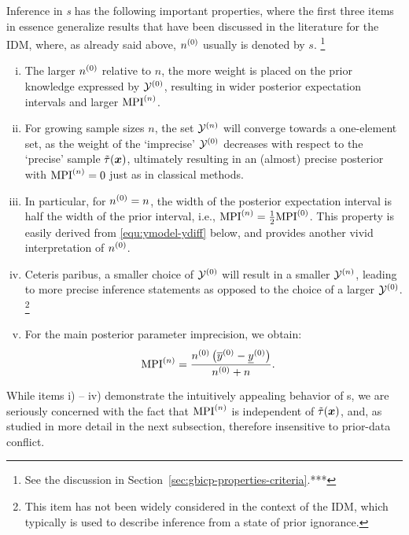 \begin{remark} \label{remark:i-v}
Inference in \emph{\ymodel s} has the following important properties,
where the first three items in essence generalize results that have
been discussed in the literature for the IDM, where, as already said
above, $n^{(0)}$ usually is denoted by $s$.%
\footnote{See the discussion in Section~\ref{sec:gbicp-properties-criteria}.***}
\begin{enumerate}[i)]
\item The larger $n^{(0)}$ relative to $n$, the more weight is placed on
the prior knowledge expressed by $\mathcal{Y}^{(0)}$, resulting in wider
posterior expectation intervals and larger ${\rm MPI}^{(n)}$.
\item For growing sample sizes $n$, the set $\mathcal{Y}^{(n)}$ will
converge towards a one-element set, as the weight of the `imprecise'
$\mathcal{Y}^{(0)}$ decreases with respect to the `precise' sample
$\tilde{\tau}({\bm x})$, ultimately resulting in an (almost)
precise posterior with ${\rm MPI}^{(n)}=0$ just as in
classical methods.
\item In particular, for $n^{(0)} = n$, the width of the posterior
expectation interval is half the width of the prior interval,
i.e., ${\rm MPI}^{(n)} = \frac{1}{2}{\rm MPI}^{(0)}$.
This property is easily derived from \eqref{equ:ymodel-ydiff}
below, and provides another vivid interpretation of $n^{(0)}$.
\item Ceteris paribus, a smaller choice of $\mathcal{Y}^{(0)}$ will result
in a smaller $\mathcal{Y}^{(n)}$, leading to more precise inference
statements as opposed to the choice of a larger $\mathcal{Y}^{(0)}$.%
\footnote{This item has not been widely considered in
the context of the IDM, which typically is used to
describe inference from a state of prior ignorance.}
\item For the main posterior parameter imprecision, we obtain:
\begin{align}\label{equ:ymodel-ydiff}
{\rm MPI}^{(n)} &= \frac{n^{(0)} \left( \overline{y}^{(0)} - \underline{y}^{(0)} \right)}{n^{(0)} + n}.
\end{align}
\end{enumerate}
\end{remark}%
While items i) -- iv) demonstrate the intuitively appealing
behavior of \ymodel s, we are seriously concerned with %
the fact that ${\rm MPI}^{(n)}$ is independent of $\tilde{\tau}({\bm x})$,
and, as studied in more detail in the next subsection, therefore
insensitive to prior-data conflict.


